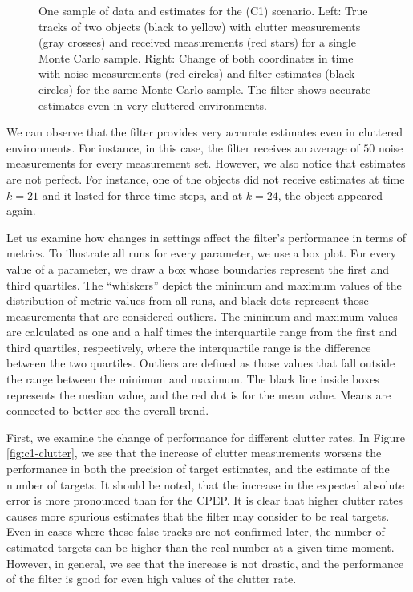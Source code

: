 \begin{figure}
\begin{subfigure}[]{0.48\linewidth}
\begin{subfigure}[b]{\linewidth}
        \end{subfigure}
    \end{subfigure}
  \caption[One sample of data and estimates for the (C1) scenario.]{One sample of data and estimates for the (C1) scenario. Left: True tracks of two objects (black to yellow) with clutter measurements (gray crosses) and received measurements (red stars) for a single Monte Carlo sample. Right: Change of both coordinates in time with noise measurements (red circles) and filter estimates (black circles) for the same Monte Carlo sample. The filter shows accurate estimates even in very cluttered environments.}
  \label{fig:c1-results-overview}
\end{figure}

We can observe that the filter provides very accurate estimates even in cluttered environments. For instance, in this case, the filter receives an average of $50$ noise measurements for every measurement set. However, we also notice that estimates are not perfect. For instance, one of the objects did not receive estimates at time $k=21$ and it lasted for three time steps, and at $k=24$, the object appeared again.

Let us examine how changes in settings affect the filter's performance in terms of metrics. To illustrate all runs for every parameter, we use a box plot. For every value of a parameter, we draw a box whose boundaries represent the first and third quartiles. The ``whiskers'' depict the minimum and maximum values of the distribution of metric values from all runs, and black dots represent those measurements that are considered outliers. The minimum and maximum values are calculated as one and a half times the interquartile range from the first and third quartiles, respectively, where the interquartile range is the difference between the two quartiles. Outliers are defined as those values that fall outside the range between the minimum and maximum. The black line inside boxes represents the median value, and the red dot is for the mean value. Means are connected to better see the overall trend. 

First, we examine the change of performance for different clutter rates. In Figure \ref{fig:c1-clutter}, we see that the increase of clutter measurements worsens the performance in both the precision of target estimates, and the estimate of the number of targets. It should be noted, that the increase in the expected absolute error is more pronounced than for the CPEP. It is clear that higher clutter rates causes more spurious estimates that the filter may consider to be real targets. Even in cases where these false tracks are not confirmed later, the number of estimated targets can be higher than the real number at a given time moment. However, in general, we see that the increase is not drastic, and the performance of the filter is good for even high values of the clutter rate.

